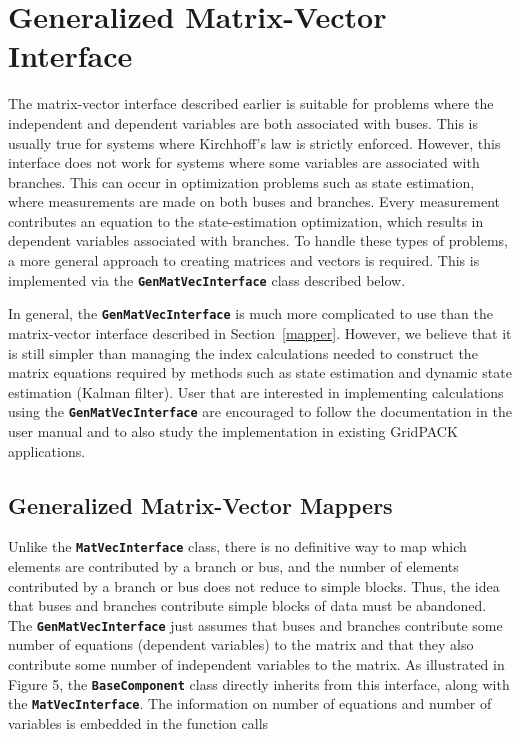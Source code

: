 \chapter{Generalized Matrix-Vector Interface}

The matrix-vector interface described earlier is suitable for problems where the
independent and dependent variables are both associated with buses. This is
usually true for systems where Kirchhoff's law is strictly enforced. However,
this interface does not work for systems where some variables are associated
with branches. This can occur in optimization problems such as state estimation,
where measurements are made on both buses and branches. Every measurement
contributes an equation to the state-estimation optimization, which results in
dependent variables associated with branches. To handle these types of problems,
a more general approach to creating matrices and vectors is required. This is
implemented via the \texttt{\textbf{GenMatVecInterface}} class described below.

In general, the \texttt{\textbf{GenMatVecInterface}} is much more complicated to
use than the matrix-vector interface described in Section~\ref{mapper}. However,
we believe that it is still simpler than managing the index calculations needed
to construct the matrix equations required by methods such as state estimation
and dynamic state estimation (Kalman filter). User that are interested in
implementing calculations using the \texttt{\textbf{GenMatVecInterface}} are
encouraged to follow the documentation in the user manual and to also study the
implementation in existing GridPACK applications.

\section{Generalized Matrix-Vector Mappers}\label{gen_matvec}

Unlike the \texttt{\textbf{MatVecInterface}} class, there is no definitive way
to map which elements are contributed by a branch or bus, and the number of
elements contributed by a branch or bus does not reduce to simple blocks. Thus,
the idea that buses and branches contribute simple blocks of data must be
abandoned. The \texttt{\textbf{GenMatVecInterface}} just assumes that buses and
branches contribute some number of equations (dependent variables) to the matrix
and that they also contribute some number of independent variables to the
matrix. As illustrated in Figure 5, the \texttt{\textbf{BaseComponent}} class
directly inherits from this interface, along with the
\texttt{\textbf{MatVecInterface}}.  The information on number of equations and
number of variables is embedded in the function calls

